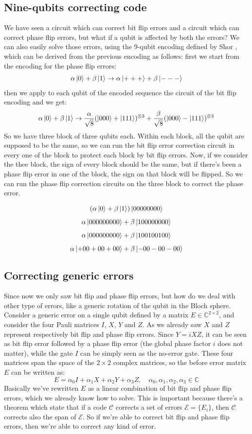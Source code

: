 \documentclass{article}
\begin{document}
	\subsection{Nine-qubits correcting code}
	We have seen a circuit which can correct bit flip errors and a circuit which can correct phase flip errors, but what if a qubit is affected by both the errors? We can also easily solve those errors, using the 9-qubit encoding defined by Shor \cite{PhysRevA.52.R2493}, which can be derived from the previous encoding as follows: first we start from the encoding for the phase flip errors:
	\[ \alpha\ket{0} + \beta\ket{1} \rightarrow \alpha\ket{+++} + \beta\ket{---}\]
	then we apply to each qubit of the encoded sequence the circuit of the bit flip encoding and we get:
	\[ \alpha\ket{0} + \beta\ket{1} \rightarrow \frac{\alpha}{\sqrt{8}}(\ket{000} + \ket{111})^{\otimes 3}+ \frac{\beta}{\sqrt{8}} (\ket{000} - \ket{111})^{\otimes 3}\]
	So we have three block of three qubits each. Within each block, all the qubit are supposed to be the same, so we can run the bit flip error correction circuit in every one of the block to protect each block by bit flip errors. Now, if we consider the thee block, the sign of every block should be the same, but if there's been a phase flip error in one of the block, the sign on that block will be flipped. So we can run the phase flip correction circuits on the three block to correct the phase error.  
	
	\[ (\alpha\ket{0} + \beta\ket{1})\ket{00000000} \]
	\[ \alpha\ket{000000000} + \beta\ket{100000000} \]
	\[ \alpha\ket{000000000} + \beta\ket{100100100} \]
	\[ \alpha\ket{+00+00+00} + \beta\ket{-00-00-00} \]
	
	\subsection{Correcting generic errors}
	Since now we only saw bit flip and phase flip errors, but how do we deal with other type of errors, like a generic rotation of the qubit in the Bloch sphere. Consider a generic error on a single qubit defined by a matrix $E \in \mathbb{C}^{2 \times 2}$, and consider the four Pauli matrices $I$, $X$, $Y$ and $Z$. As we already saw $X$ and $Z$ represent respectively bit flip and phase flip errors. Since $Y = iXZ$, it can be seen as bit flip error followed by a phase flip error (the global phase factor $i$ does not matter), while the gate $I$ can be simply seen as the no-error gate. These four matrices span the space of the $2 \times 2$ complex matrices, so the before error matrix $E$ can be written as:
	\[ E = \alpha_0I + \alpha_1X + \alpha_2Y + \alpha_3Z, \quad \alpha_0, \alpha_1, \alpha_2, \alpha_3 \in \mathbb{C}\]
	Basically we've rewritten $E$ as a linear combination of bit flip and phase flip errors, which we already know how to solve. This is important because there's a theorem which state that if a code $\mathcal{C}$ corrects a set of errors $\mathcal{E} = \{E_i\}$, then $\mathcal{C}$ corrects also the span of $\mathcal{E}$. So if we're able to correct bit flip and phase flip errors, then we're able to correct any kind of error. 
		
	
	
	
\end{document}

